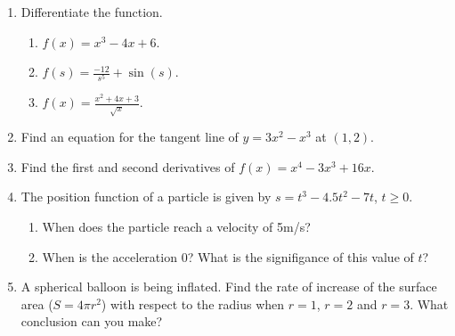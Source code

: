 \sethandouttitle{}


\begin{enumerate}
	\item	Differentiate the function.
		\begin{enumerate}
			\item	$f(x) = x^3 - 4x+6$.
			\vfill
			\item	$f(s) = \frac{-12}{s^5} + \sin(s)$.
			\vfill
			\item	$f(x) = \frac{ x^2 + 4x + 3 }{\sqrt{x}}$.
			\vfill
		\end{enumerate}

	\item	Find an equation for the tangent line of $y=3x^2 - x^3$ at $(1,2)$.
	\vfill

	\newpage

	\item 	Find the first and second derivatives of $f(x) = x^4 - 3x^3 + 16x$.
	\vfill
	
	\item	The position function of a particle is given by $s = t^3 - 4.5 t^2 - 7t$, $t \geq 0$.
		\begin{enumerate}
			\item When does the particle reach a velocity of 5m/s?
			\vfill
			\item When is the acceleration 0? What is the signifigance of this value of $t$?
			\vfill
		\end{enumerate}

	\item	A spherical balloon is being inflated. 
			Find the rate of increase of the surface area ($S= 4 \pi r^2$) 
			with respect to the radius when $r=1$, $r=2$ and $r=3$. What conclusion can you make?
	\vfill
\end{enumerate}

\allhandoutinfo

